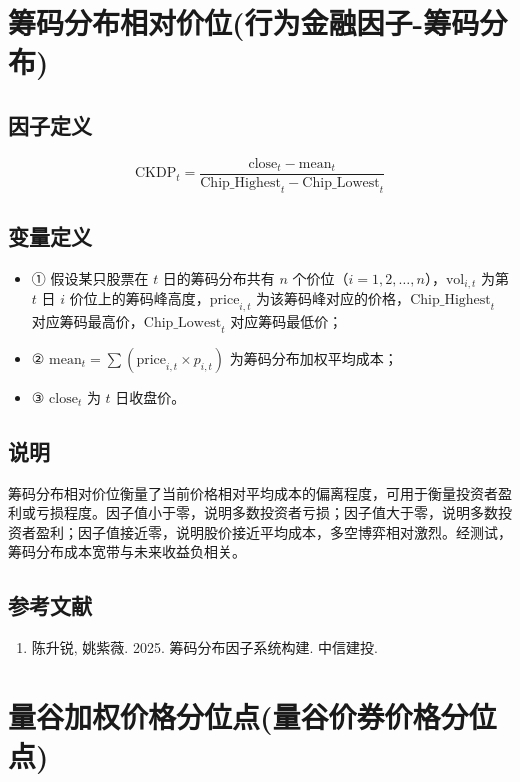 \documentclass{article}
\begin{document}
\section{筹码分布相对价位(行为金融因子-筹码分布)}

\subsection{因子定义}

\begin{equation}
    \mathrm{CKDP}_t = \frac{\mathrm{close}_t - \mathrm{mean}_t}{\mathrm{Chip\_Highest}_t - \mathrm{Chip\_Lowest}_t}
\end{equation}

\subsection{变量定义}
\begin{itemize}
    \item ① 假设某只股票在 \( t \) 日的筹码分布共有 \( n \) 个价位（\( i=1,2,\ldots,n \)），\( \mathrm{vol}_{i,t} \) 为第 \( t \) 日 \( i \) 价位上的筹码峰高度，\( \mathrm{price}_{i,t} \) 为该筹码峰对应的价格，\( \mathrm{Chip\_Highest}_t \) 对应筹码最高价，\( \mathrm{Chip\_Lowest}_t \) 对应筹码最低价；
    \item ② \( \mathrm{mean}_t = \sum (\mathrm{price}_{i,t} \times p_{i,t}) \) 为筹码分布加权平均成本；
    \item ③ \( \mathrm{close}_t \) 为 \( t \) 日收盘价。
\end{itemize}

\subsection{说明}
筹码分布相对价位衡量了当前价格相对平均成本的偏离程度，可用于衡量投资者盈利或亏损程度。因子值小于零，说明多数投资者亏损；因子值大于零，说明多数投资者盈利；因子值接近零，说明股价接近平均成本，多空博弈相对激烈。经测试，筹码分布成本宽带与未来收益负相关。

\subsection{参考文献}
\begin{enumerate}
    \item 陈升锐, 姚紫薇. 2025. 筹码分布因子系统构建. 中信建投.
\end{enumerate}

\section{量谷加权价格分位点(量谷价券价格分位点)}
\end{document}
